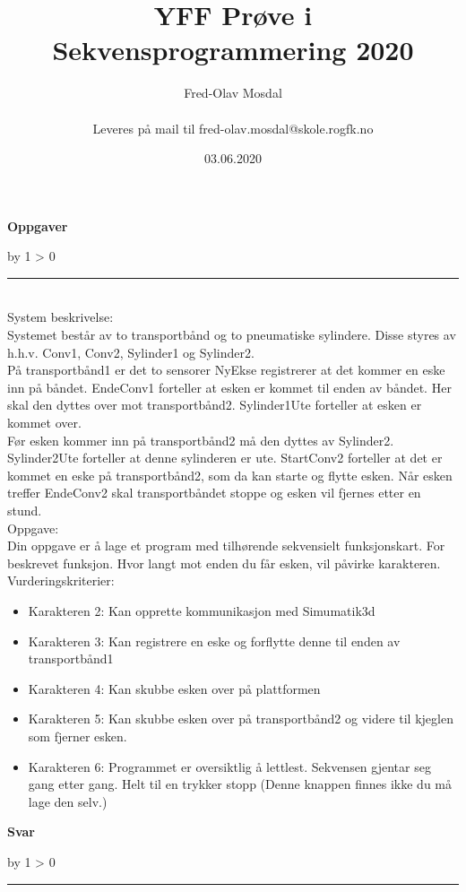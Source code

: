 \documentclass[12pt,a4paper]{article}
\def\oppgave{
            \advance\questnum by 1
            \ifnum \questnum > 0
                 \hrule
                 \vskip 3pt
                 \leftline{Oppgave \the\questnum}
                 \vskip 3pt \fi}
\def\svar{
           \advance\answnum by 1
           \ifnum \answnum > 0
                \hrule
                \vskip 3pt
                \leftline{Svar \the\answnum}
                \vskip 3pt \fi}
\begin{document}
\title {YFF Prøve i Sekvensprogrammering 2020}
\author {Fred-Olav Mosdal \\\\ Leveres på mail til fred-olav.mosdal@skole.rogfk.no }
\date {03.06.2020}
\maketitle
\vfil \eject
\vfil \eject
\centerline{\bf Oppgaver}
\vskip 5pt
\oppgave{} 

\\[0.8cm]
System beskrivelse:\\[0.051cm]

Systemet består av to transportbånd og to pneumatiske sylindere. Disse styres av h.h.v. Conv1, Conv2, Sylinder1 og Sylinder2. \\[0.3cm]

På transportbånd1 er det to sensorer NyEkse registrerer at det kommer en eske inn på båndet. EndeConv1 forteller at esken er kommet til enden av båndet. Her skal den dyttes over mot transportbånd2. Sylinder1Ute forteller at esken er kommet over. \\[0.3cm]

Før esken kommer inn på transportbånd2 må den dyttes av Sylinder2. Sylinder2Ute forteller at denne sylinderen er ute. StartConv2 forteller at det er kommet en eske på transportbånd2, som da kan starte og flytte esken. Når esken treffer EndeConv2 skal transportbåndet stoppe og esken vil fjernes etter en stund. \\[0.3cm]





Oppgave:\\
Din oppgave er å lage et program med tilhørende sekvensielt funksjonskart. For beskrevet funksjon. Hvor langt mot enden du får esken, vil påvirke karakteren. \\[0.5cm]
Vurderingskriterier:
\begin{itemize}[noitemsep]
	\item Karakteren 2: Kan opprette kommunikasjon med Simumatik3d
	\item Karakteren 3: Kan registrere en eske og forflytte denne til enden av transportbånd1
	\item Karakteren 4: Kan skubbe esken over på plattformen
	\item Karakteren 5: Kan skubbe esken over på transportbånd2 og videre til kjeglen som fjerner esken. 
	\item Karakteren 6: Programmet er oversiktlig å lettlest. Sekvensen gjentar seg gang etter gang. Helt til en trykker stopp (Denne knappen finnes ikke du må lage den selv.)
\end{itemize}

\vskip 10pt \filbreak 
\vfil \eject
\centerline{\bf Svar}
\vskip 5pt
\svar{} 
\vskip 10pt \filbreak 
\end{document}
